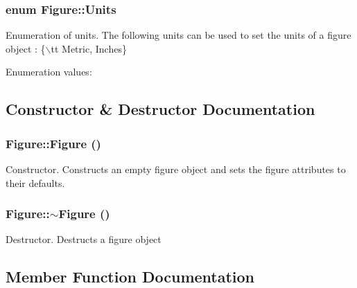 \subsubsection{\setlength{\rightskip}{0pt plus 5cm}enum Figure::Units}\label{classFigure_s25}


Enumeration of units. The following units can be used to set the units of a figure object : \{$\backslash$tt Metric, Inches\} \begin{Desc}
\item[Enumeration values: ]\par
\begin{description}
\item[{\em 
{\em Metric}\label{classFigure_s25s4}
}]\item[{\em 
{\em Inches}\label{classFigure_s25s5}
}]\end{description}
\end{Desc}



\subsection{Constructor \& Destructor Documentation}
\subsubsection{\setlength{\rightskip}{0pt plus 5cm}Figure::Figure ()}\label{classFigure_a0}


Constructor. Constructs an empty figure object and sets the figure attributes to their defaults. 
\subsubsection{\setlength{\rightskip}{0pt plus 5cm}Figure::$\sim$Figure ()}\label{classFigure_a1}


Destructor. Destructs a figure object 

\subsection{Member Function Documentation}
